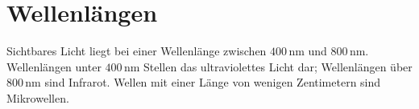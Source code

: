 \documentclass{article}
\begin{document}
 
\newcommand{\wl}[1]{$#1\,\text{nm}$} 
 
\section{Wellenlängen}
Sichtbares Licht liegt bei einer Wellenlänge zwischen \wl{400} und \wl{800}. Wellenlängen unter \wl{400} Stellen das ultraviolettes Licht dar; Wellenlängen über \wl{800} sind Infrarot. Wellen mit einer Länge von wenigen Zentimetern sind Mikrowellen.
\end{document}
